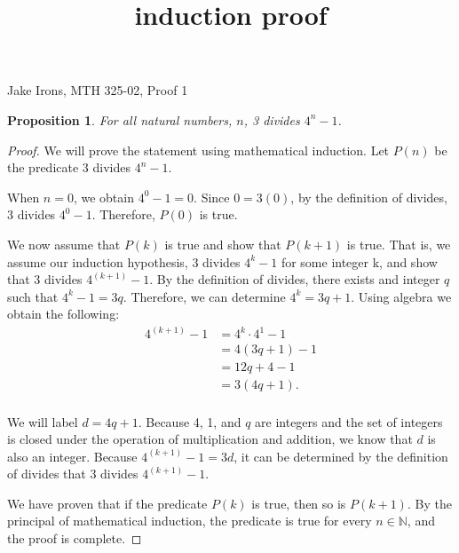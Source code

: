 \documentclass[11 pt]{article}
\title{induction proof}
\newtheorem{proposition}{Proposition}
\newcommand{\newpar}{\vspace{.15in}\noindent}
\begin{document}
\noindent Jake Irons, MTH 325-02, Proof 1

\newpar
\begin{proposition}
For all natural numbers, $n$, 3 divides $4^n - 1$.
\end{proposition}
\begin{proof}
We will prove the statement using mathematical induction. Let $P(n)$ be the predicate 3 divides $4^n-1$.

\newpar
When $n=0$, we obtain $4^0-1 = 0$. Since $0=3(0)$, by the definition of divides, 3 divides $4^0-1$. Therefore, $P(0)$ is true.

\newpar We now assume that $P(k)$ is true and show that $P(k+1)$ is true. That is, we assume our induction hypothesis, 3 divides $4^k-1$ for some integer k, and show that 3 divides $4^{(k+1)}-1$. By the definition of divides, there exists and integer $q$ such that $4^k-1=3q$. Therefore, we can determine $4^k=3q+1$. Using algebra we obtain the following:
\begin{align*}
4^{(k+1)}-1&=4^k\cdot4^1-1 \\
&= 4(3q+1)-1 \\
&= 12q+4-1 \\
&= 3(4q+1). \\
\end{align*}

\noindent
We will label $d=4q+1$. Because 4, 1, and $q$ are integers and the set of integers is closed under the operation of multiplication and addition, we know that $d$ is also an integer. Because $4^{(k+1)}-1=3d$, it can be determined by the definition of divides that 3 divides $4^{(k+1)}-1$.

\newpar
We have proven that if the predicate $P(k)$ is true, then so is $P(k+1)$. By the principal of mathematical induction, the predicate is true for every $n\in{\mathbb{N}}$, and the proof is complete.
\end{proof}
\end{document}
